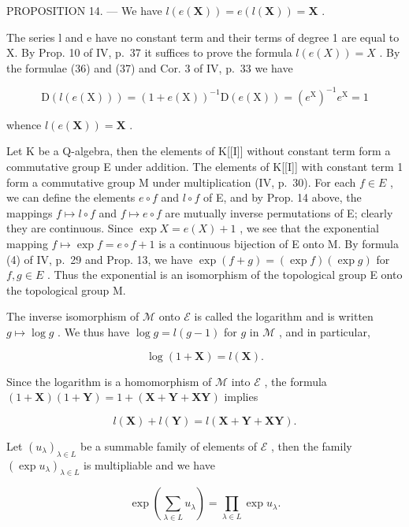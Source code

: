 PROPOSITION 14. --- We have \(l(e(\mathbf{X})) = e(l(\mathbf{X})) = \mathbf{X}\) .

The series l and e have no constant term and their terms of degree 1 are equal to X. By Prop. 10 of IV, p.~37 it suffices to prove the formula \(l(e(X)) = X\) . By the formulae (36) and (37) and Cor. 3 of IV, p.~33 we have

\[
\mathrm{D} (l (e (\mathrm{X}))) = (1 + e (\mathrm{X})) ^ {- 1} \mathrm{D} (e (\mathrm{X})) = (e ^ {\mathrm{X}}) ^ {- 1} e ^ {\mathrm{X}} = 1
\]

whence \(l(e(\mathbf{X})) = \mathbf{X}\) .

Let K be a Q-algebra, then the elements of K{[}{[}I{]}{]} without constant term form a commutative group E under addition. The elements of K{[}{[}I{]}{]} with constant term 1 form a commutative group M under multiplication (IV, p.~30). For each \(f \in E\) , we can define the elements \(e \circ f\) and \(l \circ f\) of E, and by Prop. 14 above, the mappings \(f \mapsto l \circ f\) and \(f \mapsto e \circ f\) are mutually inverse permutations of E; clearly they are continuous. Since \(\exp X = e(X) + 1\) , we see that the exponential mapping \(f \mapsto \exp f = e \circ f + 1\) is a continuous bijection of E onto M. By formula (4) of IV, p.~29 and Prop. 13, we have \(\exp(f + g) = (\exp f)(\exp g)\) for \(f, g \in E\) . Thus the exponential is an isomorphism of the topological group E onto the topological group M.

The inverse isomorphism of \(\mathcal{M}\) onto \(\mathcal{E}\) is called the logarithm and is written \(g \mapsto \log g\) . We thus have \(\log g = l(g - 1)\) for \(g\) in \(\mathcal{M}\) , and in particular,

\[
\log (1 + \mathbf {X}) = l (\mathbf {X}).\tag{38}
\]

Since the logarithm is a homomorphism of \(\mathcal{M}\) into \(\mathcal{E}\) , the formula \((1 + \mathbf{X})(1 + \mathbf{Y}) = 1 + (\mathbf{X} + \mathbf{Y} + \mathbf{X}\mathbf{Y})\) implies

\[
l (\mathbf {X}) + l (\mathbf {Y}) = l (\mathbf {X} + \mathbf {Y} + \mathbf {X Y}).\tag{39}
\]

Let \((u_{\lambda})_{\lambda \in L}\) be a summable family of elements of \(\mathcal{E}\) , then the family \((\exp u_{\lambda})_{\lambda \in L}\) is multipliable and we have

\[
\exp \left(\sum_ {\lambda \in L} u _ {\lambda}\right) = \prod_ {\lambda \in L} \exp u _ {\lambda}.\tag{40}
\]

